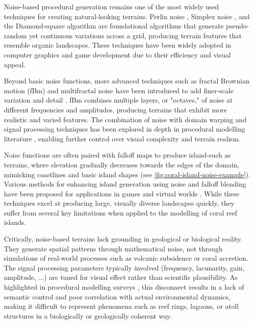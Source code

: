 Noise-based procedural generation remains one of the most widely used techniques for creating natural-looking terrains. Perlin noise \cite{Perlin1985}, Simplex noise \cite{Perlin2001}, and the Diamond-square algorithm \cite{Fournier1982} are foundational algorithms that generate pseudo-random yet continuous variations across a grid, producing terrain features that resemble organic landscapes. These techniques have been widely adopted in computer graphics and game development due to their efficiency and visual appeal.

Beyond basic noise functions, more advanced techniques such as fractal Brownian motion (fBm) and multifractal noise have been introduced to add finer-scale variation and detail \cite{Musgrave1989,Ebert2003}. fBm combines multiple layers, or "octaves," of noise at different frequencies and amplitudes, producing terrains that exhibit more realistic and varied features. The combination of noise with domain warping and signal processing techniques has been explored in depth in procedural modelling literature \cite{Reinhard2010}, enabling further control over visual complexity and terrain realism.

Noise functions are often paired with falloff maps to produce island-such as terrains, where elevation gradually decreases towards the edges of the domain, mimicking coastlines and basic island shapes (see \cref{fig:coral-island-noise-example}). Various methods for enhancing island generation using noise and falloff blending have been proposed for applications in games and virtual worlds \cite{Olsen2004}. While these techniques excel at producing large, visually diverse landscapes quickly, they suffer from several key limitations when applied to the modelling of coral reef islands.

Critically, noise-based terrains lack grounding in geological or biological reality. They generate spatial patterns through mathematical noise, not through simulations of real-world processes such as volcanic subsidence or coral accretion. The signal processing parameters typically involved (frequency, lacunarity, gain, amplitude, ...) are tuned for visual effect rather than scientific plausibility. As highlighted in procedural modelling surveys \cite{Smelik2009,Galin2019}, this disconnect results in a lack of semantic control and poor correlation with actual environmental dynamics, making it difficult to represent phenomena such as reef rings, lagoons, or atoll structures in a biologically or geologically coherent way.

